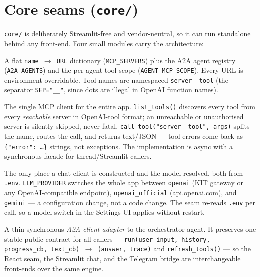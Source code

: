 \documentclass[11pt,a4paper]{article}
\newcommand{\code}[1]{{\small\texttt{#1}}}
\begin{document}
\section{Core seams (\texttt{core/})}
\code{core/} is deliberately Streamlit-free and vendor-neutral, so it can run standalone
behind any front-end. Four small modules carry the architecture:

\begin{description}[style=unboxed,leftmargin=0em,itemsep=2pt]
  \item[\code{config.py} --- the registry.] A flat \code{name $\rightarrow$ URL} dictionary
    (\code{MCP\_SERVERS}) plus the A2A agent registry (\code{A2A\_AGENTS}) and the per-agent
    tool scope (\code{AGENT\_MCP\_SCOPE}). Every URL is environment-overridable. Tool names are
    namespaced \code{server\_\_tool} (the separator \code{SEP="\_\_"}, since dots are illegal in
    OpenAI function names).
  \item[\code{host.py} --- \code{ToolHost}.] The single MCP client for the entire app.
    \code{list\_tools()} discovers every tool from every \emph{reachable} server in OpenAI-tool
    format; an unreachable or unauthorised server is silently skipped, never fatal.
    \code{call\_tool("server\_\_tool", args)} splits the name, routes the call, and returns
    text/JSON --- tool errors come back as \code{\{"error": \ldots\}} strings, not exceptions.
    The implementation is async with a synchronous facade for thread/Streamlit callers.
  \item[\code{llm.py} --- the LLM seam.] The only place a chat client is constructed and the
    model resolved, both from \code{.env}. \code{LLM\_PROVIDER} switches the whole app between
    \code{openai} (KIT gateway or any OpenAI-compatible endpoint), \code{openai\_official}
    (api.openai.com), and \code{gemini} --- a configuration change, not a code change. The seam
    re-reads \code{.env} per call, so a model switch in the Settings UI applies without restart.
  \item[\code{orchestrator.py} --- \code{FitDashOrchestrator}.] A thin synchronous \emph{A2A
    client adapter} to the orchestrator agent. It preserves one stable public contract for all
    callers --- \code{run(user\_input, history, progress\_cb, text\_cb) $\rightarrow$ (answer,
    trace)} and \code{refresh\_tools()} --- so the React seam, the Streamlit chat, and the
    Telegram bridge are interchangeable front-ends over the same engine.
\end{description}
\end{document}
